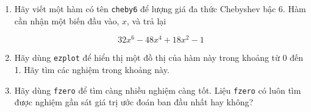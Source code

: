 \documentclass[12pt]{book}
\begin{document}
\begin{ex}

\begin{enumerate}

\item Hãy viết một hàm có tên {\tt cheby6} để lượng giá đa thức
Chebyshev bậc 6. Hàm cần nhận một biến đầu vào, $x$, và trả lại

\begin{equation}
32 x^6 - 48 x^4 + 18 x^2 - 1
\end{equation}
%
\item Hãy dùng {\tt ezplot} để hiển thị một đồ thị của hàm này trong
khoảng từ 0 đến 1. Hãy tìm các nghiệm trong khoảng này.

\item Hãy dùng {\tt fzero} để tìm càng nhiều nghiệm càng tốt. Liệu
{\tt fzero} có luôn tìm được nghiệm gần sát giá trị ước đoán ban đầu
nhất hay không?

\end{enumerate}
\end{ex}
\end{document}
